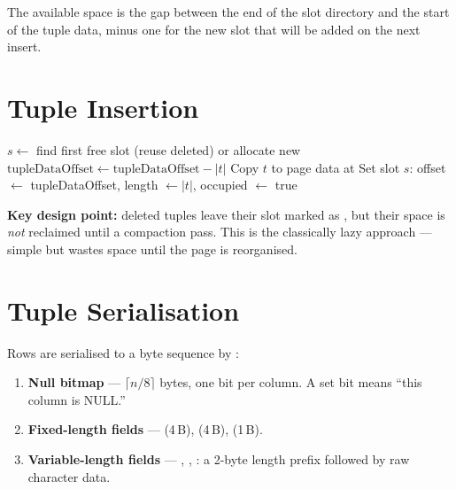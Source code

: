The available space is the gap between the end of the slot directory and the start of the tuple data, minus one  for the new slot that will be added on the next insert.

\section{Tuple Insertion}
\label{sec:tuple-insert}

\begin{algorithm}[H]
\caption{Insert a tuple into a page.}
\label{alg:insert-tuple}
$s \leftarrow$ find first free slot (reuse deleted) or allocate new\;
$\text{tupleDataOffset} \leftarrow \text{tupleDataOffset} - |t|$\;
Copy $t$ to page data at \;
Set slot $s$: offset $\leftarrow$ tupleDataOffset, length $\leftarrow |t|$, occupied $\leftarrow$ true\;
\;
\end{algorithm}

\textbf{Key design point:} deleted tuples leave their slot marked as , but their space is \emph{not} reclaimed until a compaction pass.  This is the classically lazy approach --- simple but wastes space until the page is reorganised.

\section{Tuple Serialisation}
\label{sec:serialisation}

Rows are serialised to a byte sequence by :

\begin{enumerate}[nosep]
  \item \textbf{Null bitmap} --- $\lceil n/8 \rceil$ bytes, one bit per column.  A set bit means ``this column is NULL.''
  \item \textbf{Fixed-length fields} ---  (4\,B),  (4\,B),  (1\,B).
  \item \textbf{Variable-length fields} --- , , : a 2-byte length prefix followed by raw character data.
\end{enumerate}

